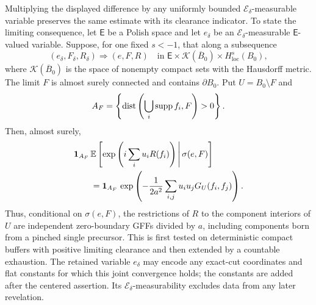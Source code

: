 \begin{proposition}
Multiplying the displayed difference by any uniformly bounded
\(\mathcal E_\delta\)-measurable variable preserves the same estimate with
its clearance indicator. To state the limiting consequence, let
\(\mathsf E\) be a Polish space and let \(e_\delta\) be an
\(\mathcal E_\delta\)-measurable \(\mathsf E\)-valued variable. Suppose,
for one fixed \(s<-1\), that along a subsequence
\[
 (e_\delta,F_\delta,R_\delta)\Longrightarrow(e,F,R)
 \quad\text{in }\mathsf E\times\mathcal K(\overline B_0)
                   \times H^s_{\mathrm{loc}}(B_0),
\]
where \(\mathcal K(\overline B_0)\) is the space of nonempty compact sets
with the Hausdorff metric. The limit \(F\) is almost surely connected and
contains \(\partial B_0\). Put \(U=B_0\setminus F\) and
\[
 A_F=\left\{\operatorname{dist}\left(\bigcup_i\operatorname{supp} f_i,F\right)>0\right\}.
\]
Then, almost surely,
\begin{equation}
\begin{split}
 &\mathbf 1_{A_F}\,
 \mathbb E\left[\exp\left(i\sum_i u_iR(f_i)\right)
             \,\middle|\,\sigma(e,F)\right]\\
 &\qquad=\mathbf 1_{A_F}\,
 \exp\left(-\frac1{2a^2}
                \sum_{i,j}u_i u_jG_U(f_i,f_j)\right).
\end{split}
\label{eq:conditional-flat-limit}
\end{equation}
Thus, conditional on \(\sigma(e,F)\), the restrictions of \(R\) to the
component interiors of \(U\) are independent zero-boundary GFFs divided by
\(a\), including components born from a pinched single precursor. This is
first tested on deterministic compact buffers with positive limiting
clearance and then extended by a countable exhaustion. The retained variable
\(e_\delta\) may encode any exact-cut coordinates and flat constants for
which this joint convergence holds; the constants are added after the
centered assertion. Its \(\mathcal E_\delta\)-measurability excludes data
from any later revelation.
\end{proposition}

